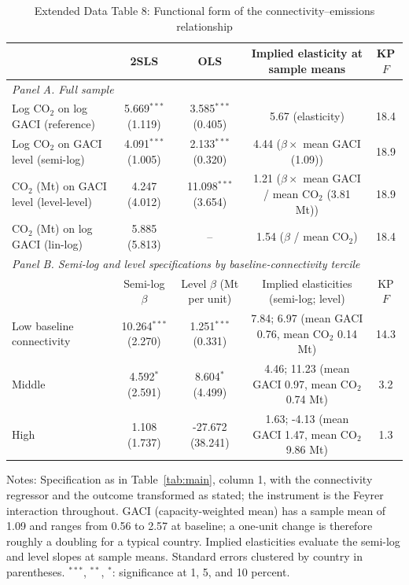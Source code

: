 \documentclass[12pt]{article}
\begin{document}
\begin{table}[htbp]
\centering
\begin{threeparttable}
\caption{Extended Data Table 8: Functional form of the connectivity--emissions relationship}
\label{tab:funcform}
\footnotesize
\begin{tabular}{lcccc}
\toprule
 & 2SLS & OLS & Implied elasticity at sample means & KP $F$ \\
\midrule
\multicolumn{5}{l}{\textit{Panel A. Full sample}} \\
  Log CO$_2$ on log GACI (reference) & 5.669$^{***}$ (1.119) & 3.585$^{***}$ (0.405) & 5.67 (elasticity) & 18.4 \\
  Log CO$_2$ on GACI level (semi-log) & 4.091$^{***}$ (1.005) & 2.133$^{***}$ (0.320) & 4.44 ($\beta \times$ mean GACI (1.09)) & 18.9 \\
  CO$_2$ (Mt) on GACI level (level-level) & 4.247 (4.012) & 11.098$^{***}$ (3.654) & 1.21 ($\beta \times$ mean GACI / mean CO$_2$ (3.81 Mt)) & 18.9 \\
  CO$_2$ (Mt) on log GACI (lin-log) & 5.885 (5.813) & -- & 1.54 ($\beta$ / mean CO$_2$) & 18.4 \\
\midrule
\multicolumn{5}{l}{\textit{Panel B. Semi-log and level specifications by baseline-connectivity tercile}} \\
 & Semi-log $\beta$ & Level $\beta$ (Mt per unit) & Implied elasticities (semi-log; level) & KP $F$ \\
  Low baseline connectivity & 10.264$^{***}$ (2.270) & 1.251$^{***}$ (0.331) & 7.84; 6.97 (mean GACI 0.76, mean CO$_2$ 0.14 Mt) & 14.3 \\
  Middle & 4.592$^{*}$ (2.591) & 8.604$^{*}$ (4.499) & 4.46; 11.23 (mean GACI 0.97, mean CO$_2$ 0.74 Mt) & 3.2 \\
  High & 1.108 (1.737) & -27.672 (38.241) & 1.63; -4.13 (mean GACI 1.47, mean CO$_2$ 9.86 Mt) & 1.3 \\
\bottomrule
\end{tabular}
\begin{tablenotes}[flushleft]
\footnotesize
\item Notes: Specification as in Table~\ref{tab:main}, column 1, with the connectivity regressor and the outcome transformed as stated; the instrument is the Feyrer interaction throughout. GACI (capacity-weighted mean) has a sample mean of 1.09 and ranges from 0.56 to 2.57 at baseline; a one-unit change is therefore roughly a doubling for a typical country. Implied elasticities evaluate the semi-log and level slopes at sample means. Standard errors clustered by country in parentheses. $^{***}$, $^{**}$, $^{*}$: significance at 1, 5, and 10 percent.
\end{tablenotes}
\end{threeparttable}
\end{table}
\end{document}
